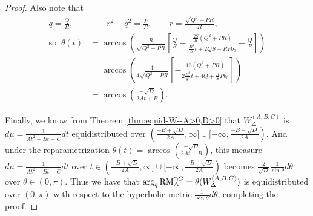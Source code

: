 \documentclass[11pt,letterpaper,reqno]{amsart}
\numberwithin{equation}{section}
\numberwithin{figure}{section}
\numberwithin{table}{section}
\newcommand{\lrp}[1]{\left(#1\right)}
\newcommand{\lrb}[1]{\left[#1\right]}
\newcommand{\RM}{\textnormal{RM}}
\begin{document}
\begin{proof}
Also note that
\begin{align} 
    q = \frac{Q}{R}, &\qquad r^2-q^2 = \frac{P}{R}, \qquad r=\frac{\sqrt{Q^2+PR}}{R},  \\
    \text{so }\ 
    \theta(t) 
    &= \arccos\lrp{ \frac{R}{\sqrt{Q^2+PR}} \lrb{
        \frac{Q}{R} - \frac{\frac{2S}{R}(Q^2+PR)}{\frac{R^2}{S}t +2QS+RPb_0  }
    - \frac QR }} \\
    &= \arccos\lrp{ \frac{1}{4\sqrt{Q^2+PR}} \lrb{
         - \frac{16(Q^2+PR)}{2\frac{R^2}{S^2}t +4Q+\frac{R}{S}Pb_0  }
    }} \\
    &= \arccos\lrp{ \frac{-\sqrt D}{ 2A t+B } }.
\end{align}

Finally, we know from Theorem \ref{thm:equid-W--A>0,D>0} that $W_{\Delta}^{(A,B,C)}$ is $d\mu = \frac{1}{At^2+Bt+C} dt$ equidistributed over  $(\frac{-B+\sqrt{D}}{2A},\infty] \cup [-\infty,\frac{-B-\sqrt{D}}{2A})$. And under the reparametrization 
$\theta(t) = \arccos\lrp{ \frac{-\sqrt D}{ 2A t+B } }$, this measure
$d\mu = \frac{1}{At^2+Bt+C} dt$ over $t \in (\frac{-B+\sqrt{D}}{2A},\infty] \cup [-\infty,\frac{-B-\sqrt{D}}{2A})$ becomes $\frac{2}{\sqrt{D}} \frac{1}{\sin \theta} d\theta$ over $\theta \in (0,\pi)$. Thus we have that $\arg_q \RM^{\cap G}_{\Delta} = \theta(W_{\Delta}^{(A,B,C)})$ is equidistributed over $(0,\pi)$ with respect to the hyperbolic metric $\frac{1}{\sin \theta} d\theta$, completing the proof.
\end{proof}
\end{document}
